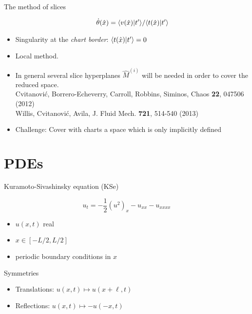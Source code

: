 \begin{frame}[t]{The method of slices}
\begin{itemize}
	\[
	  \dot{\theta}(\sspRed) = {\braket{\vel(\sspRed)}{\sliceTan{}}}/
			{\braket{\groupTan(\sspRed ) }{\sliceTan{} } }
	\]
	\item Singularity at the \emph{chart border}:
	      $\braket{\groupTan(\sspRed ) }{\sliceTan{} }=0$
	\item Local method.
	\item In general several slice hyperplanes $\hat{M}^{(i)}$ will be needed in order to cover the reduced space.\\
	      {\footnotesize Cvitanovi\'c, Borrero-Echeverry, Carroll, Robbins, Siminos, Chaos \textbf{22}, 047506 (2012)}\\
	      {\footnotesize Willis, Cvitanovi\'c, Avila, J. Fluid Mech. \textbf{721}, 514-540 (2013)}
	\item Challenge: Cover with charts a space which is only implicitly defined
      \end{itemize}
\end{frame}


\section{PDEs}

\begin{frame}{Kuramoto-Sivashinsky equation (KSe)}
 \begin{block}{}
  \[
	u_t =  -{\textstyle\frac{1}{2}}(u^2)_x-u_{xx}-u_{xxxx}
  \]
  \begin{itemize}
    \item $u(x,t)$ real
	\item $x\in[-L/2,L/2]$
	\item periodic boundary conditions in $x$
  \end{itemize}
 \end{block}
  \begin{block}{Symmetries}
    \begin{itemize}
	  \item Translations: $u(x,t) \mapsto u(x+\ell,t)$
	  \item Reflections: $u(x,t) \mapsto -u(-x,t)$
    \end{itemize}

  \end{block}
\end{frame}

